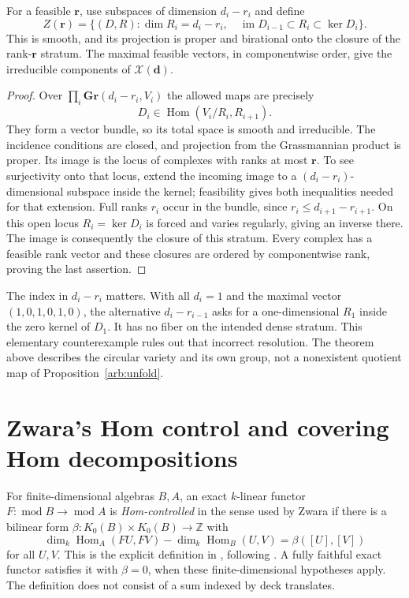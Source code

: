\begin{theorem}
\label{arb:incidence}
For a feasible $\mathbf r$, use subspaces of dimension $d_i-r_i$ and define
\[
 Z(\mathbf r)=\{(D,R):\dim R_i=d_i-r_i,\quad
       \operatorname{im}D_{i-1}\subset R_i\subset\ker D_i\}.
\]
This is smooth, and its projection is proper and birational onto the closure
of the rank-$\mathbf r$ stratum. The maximal feasible vectors, in componentwise
order, give the irreducible components of $\mathcal X(\mathbf d)$.
\end{theorem}
\begin{proof}
Over $\prod_i\mathbf{Gr}(d_i-r_i,V_i)$ the allowed maps are precisely
\[
 D_i\in\operatorname{Hom}(V_i/R_i,R_{i+1}).
\]
They form a vector bundle, so its total space is smooth and irreducible.
The incidence conditions are closed, and projection from the Grassmannian
product is proper. Its image is the locus of complexes with ranks at most
$\mathbf r$. To see surjectivity onto that locus, extend the incoming image to
a $(d_i-r_i)$-dimensional subspace inside the kernel; feasibility gives both
inequalities needed for that extension. Full ranks $r_i$ occur in the bundle,
since $r_i\le d_{i+1}-r_{i+1}$. On this open locus $R_i=\ker D_i$ is forced
and varies regularly, giving an inverse there. The image is consequently the
closure of this stratum. Every complex has a feasible rank vector and these
closures are ordered by componentwise rank, proving the last assertion.
\end{proof}
The index in $d_i-r_i$ matters. With all $d_i=1$ and the maximal vector
$(1,0,1,0,1,0)$, the alternative $d_i-r_{i-1}$ asks for a one-dimensional
$R_1$ inside the zero kernel of $D_1$. It has no fiber on the intended dense
stratum. This elementary counterexample rules out that incorrect resolution.
The theorem above describes the circular variety and its own group, not a
nonexistent quotient map of Proposition~\ref{arb:unfold}.

\section[Hom control and coverings]{Zwara's Hom control and covering Hom decompositions}
For finite-dimensional algebras $B,A$, an exact $k$-linear functor
$F:\operatorname{mod}B\to\operatorname{mod}A$ is \emph{Hom-controlled} in the
sense used by Zwara if there is a bilinear form
$\beta:K_0(B)\times K_0(B)\to\mathbb Z$ with
\begin{equation}\label{arb:homcontrol}
 \dim_k\operatorname{Hom}_A(FU,FV)-\dim_k\operatorname{Hom}_B(U,V)
       =\beta([U],[V])
\end{equation}
for all $U,V$. This is the explicit definition in
\cite[Section 6, p.71]{ARBRiedtmannZwara}, following \cite{ARBZwara}.
A fully faithful exact functor satisfies it with $\beta=0$, when these
finite-dimensional hypotheses apply. The definition does not consist of a
sum indexed by deck translates.

